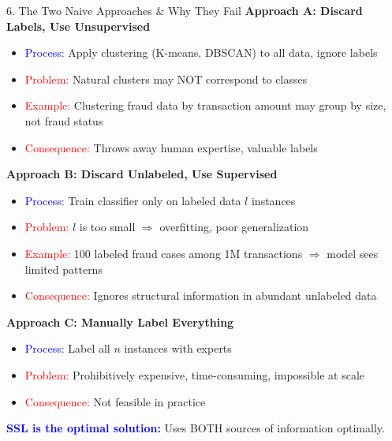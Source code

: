 \documentclass[8pt]{beamer}
\begin{document}
	\begin{frame}{6. The Two Naive Approaches \& Why They Fail}
		\fontsize{6.5}{7.5}\selectfont
		\textbf{Approach A: Discard Labels, Use Unsupervised}
		
		\begin{itemize}
			\item \textcolor{blue}{Process:} Apply clustering (K-means, DBSCAN) to all data, ignore labels
			\item \textcolor{red}{Problem:} Natural clusters may NOT correspond to classes
			\item \textcolor{red}{Example:} Clustering fraud data by transaction amount may group by size, not fraud status
			\item \textcolor{red}{Consequence:} Throws away human expertise, valuable labels
		\end{itemize}
		
		\textbf{Approach B: Discard Unlabeled, Use Supervised}
		
		\begin{itemize}
			\item \textcolor{blue}{Process:} Train classifier only on labeled data $l$ instances
			\item \textcolor{red}{Problem:} $l$ is too small $\Rightarrow$ overfitting, poor generalization
			\item \textcolor{red}{Example:} 100 labeled fraud cases among 1M transactions $\Rightarrow$ model sees limited patterns
			\item \textcolor{red}{Consequence:} Ignores structural information in abundant unlabeled data
		\end{itemize}
		
		\textbf{Approach C: Manually Label Everything}
		
		\begin{itemize}
			\item \textcolor{blue}{Process:} Label all $n$ instances with experts
			\item \textcolor{red}{Problem:} Prohibitively expensive, time-consuming, impossible at scale
			\item \textcolor{red}{Consequence:} Not feasible in practice
		\end{itemize}
		
		\textcolor{blue}{\textbf{SSL is the optimal solution:}} Uses BOTH sources of information optimally.
	\end{frame}
	
	
\end{document}
